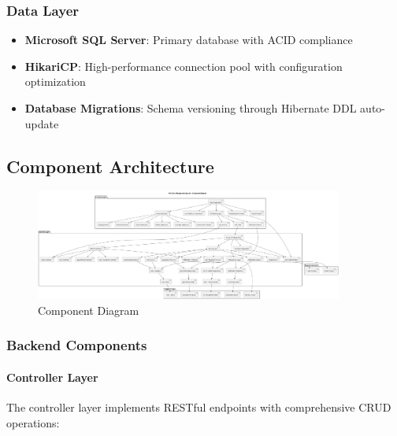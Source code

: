 \documentclass[12pt,a4paper]{article}
\begin{document}
\subsubsection{Data Layer}
\begin{itemize}
    \item \textbf{Microsoft SQL Server}: Primary database with ACID compliance
    \item \textbf{HikariCP}: High-performance connection pool with configuration optimization
    \item \textbf{Database Migrations}: Schema versioning through Hibernate DDL auto-update
\end{itemize}

\subsection{Component Architecture}

\begin{figure}[H]
\centering
\includegraphics[width=0.9\textwidth]{diagrams/component_diagram}
\caption{Component Diagram}
\label{fig:component-diagram}
\end{figure}

\subsubsection{Backend Components}

\paragraph{Controller Layer}
The controller layer implements RESTful endpoints with comprehensive CRUD operations:
\end{document}
